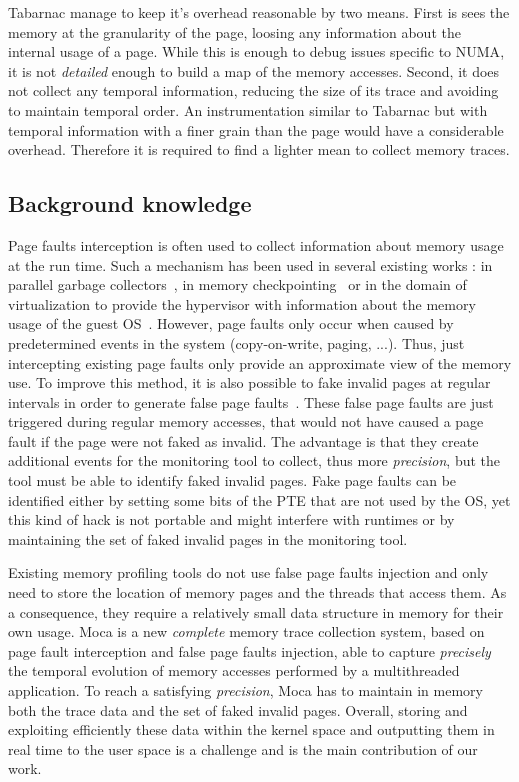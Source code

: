 \gls{Tabarnac} manage to keep it's overhead reasonable by two means.
First is sees the memory at the granularity of the page, loosing any information about the internal usage of a page.
While this is enough to debug issues specific to \gls{NUMA}, it is not \emph{detailed} enough to build a map of the memory accesses.
Second, it does not collect any temporal information, reducing the size of its trace and avoiding to maintain temporal order.
An instrumentation similar to \gls{Tabarnac} but with temporal information with a finer grain than the page would have a considerable overhead.
Therefore it is required to find a lighter mean to collect memory traces.

\subsection{Background knowledge}

Page faults interception is often used to collect information about memory usage at the run time.
Such a mechanism has been used in several existing works : in parallel garbage collectors~\cite{Boehm91Mostly}, in memory checkpointing~\cite{Heo05Spaceefficient} or in the domain of virtualization to provide the hypervisor with information about the memory usage of the guest \gls{OS}~\cite{Jones06Geiger}.
However, page faults only occur when caused by predetermined events in the system (copy-on-write, paging, ...).
Thus, just intercepting existing page faults only provide an approximate view of the memory use.
To improve this method, it is also possible to fake invalid pages at regular intervals in order to generate false page faults~\cite{Bae12Dynamic,Diener13CommunicationBased}.
These false page faults are just triggered during regular memory accesses, that would not have caused a page fault if the page were not faked as invalid.
The advantage is that they create additional events for the monitoring tool to collect, thus more \emph{precision}, but the tool must be able to identify faked invalid pages.
Fake page faults can be identified either by setting some bits of the \gls{PTE} that are not used by the \gls{OS}, yet this kind of hack is not portable and might interfere with runtimes or by maintaining the set of faked invalid pages in the monitoring tool.

Existing memory profiling tools do not use false page faults injection and only need to store the location of memory pages and the threads that access them.
As a consequence, they require a relatively small data structure in memory for their own usage.
\gls{Moca} is a new \emph{complete} memory trace collection system, based on page fault interception and false page faults injection, able to capture \emph{precisely} the temporal evolution of memory accesses performed by a multithreaded application.
To reach a satisfying \emph{precision}, \gls{Moca} has to maintain in memory both the trace data and the set of faked invalid pages.
Overall, storing and exploiting efficiently these data within the kernel space and outputting them in real time to the user space is a challenge and is the main contribution of our work.


